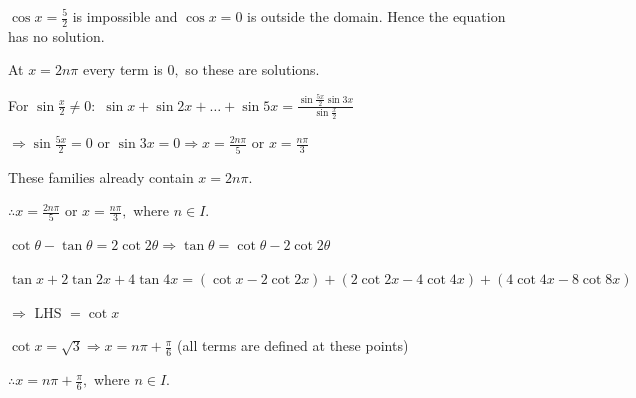   $\cos x = \frac{5}{2}$ is impossible and $\cos x = 0$ is outside the domain. Hence the equation has no solution.

\item At $x = 2n\pi$ every term is $0,$ so these are solutions.

  For $\sin\frac{x}{2}\neq 0:$ $\sin x + \sin2x + \ldots + \sin5x = \frac{\sin\frac{5x}{2}\sin3x}{\sin\frac{x}{2}}$

  $\Rightarrow \sin\frac{5x}{2} = 0$ or $\sin3x = 0 \Rightarrow x = \frac{2n\pi}{5}$ or $x = \frac{n\pi}{3}$

  These families already contain $x = 2n\pi.$

  $\therefore x = \frac{2n\pi}{5}$ or $x = \frac{n\pi}{3},$ where $n\in I.$

\item $\cot\theta - \tan\theta = 2\cot2\theta \Rightarrow \tan\theta = \cot\theta - 2\cot2\theta$

  $\tan x + 2\tan2x + 4\tan4x = (\cot x - 2\cot2x) + (2\cot2x - 4\cot4x) + (4\cot4x - 8\cot8x)$

  $\Rightarrow$ LHS $= \cot x$

  $\cot x = \sqrt{3} \Rightarrow x = n\pi + \frac{\pi}{6}$ (all terms are defined at these points)

  $\therefore x = n\pi + \frac{\pi}{6},$ where $n\in I.$
\stopitemize
